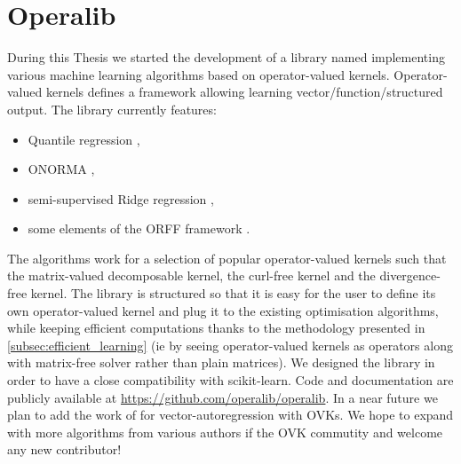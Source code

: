 \section{Operalib}
During this Thesis we started the development of a library named 
implementing various machine learning algorithms based on operator-valued
kernels. Operator-valued kernels defines a framework allowing learning
vector/function/structured output. The library currently features:
\begin{itemize}
    \item Quantile regression \citep{sangnier2016joint},
    \item \acs{ONORMA} \citep{audiffren2013online},
    \item semi-supervised Ridge regression \citep{Brouard2016_jmlr},
    \item some elements of the \acs{ORFF} framework \citep{brault2016random}.
\end{itemize}
The algorithms work for a selection of popular operator-valued kernels such
that the matrix-valued decomposable kernel, the curl-free kernel and the
divergence-free kernel. The library is structured so that it is easy for the
user to define its own operator-valued kernel and plug it to the existing
optimisation algorithms, while keeping efficient computations thanks to the
methodology presented in \cref{subsec:efficient_learning} (\acs{ie} by seeing
operator-valued kernels as operators along with matrix-free solver rather than
plain matrices). We designed the library in order to have a close compatibility
with scikit-learn. Code and documentation are publicly available at
\url{https://github.com/operalib/operalib}. In a near future we plan to add the
work of \citet{lim2015operator} for vector-autoregression with \acsp{OVK}. We
hope to expand with more algorithms from various authors if the \acs{OVK}
commutity and welcome any new contributor!

\chapterend
